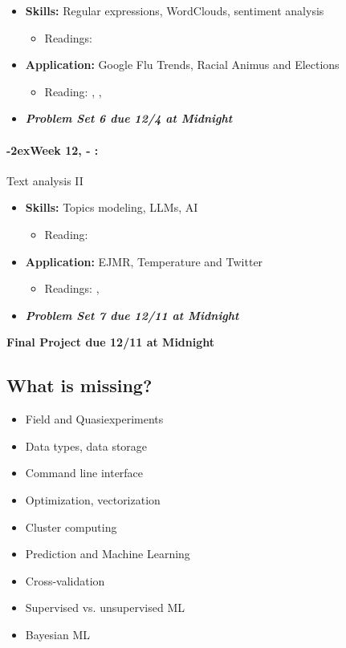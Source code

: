 \documentclass[11pt]{article}
\newcommand{\week}[1]{%
  \paragraph*{\kern-2ex\quad #1, \AdvanceDate[1]\syldate{\today} - \AdvanceDate[2]\syldate{\today}:}%
  \ifdim\wd1=\wd\MONDAY
    \AdvanceDate[7]
  \else
    \AdvanceDate[7]
  \fi%
}
\begin{document}
\begin{itemize}
  \item \textbf{Skills:} Regular expressions, WordClouds, sentiment analysis
  \begin{itemize}
    \item Readings: \textbf{\cite{gentzkow2019text}}
  \end{itemize}
  \item \textbf{Application:} Google Flu Trends, Racial Animus and Elections
  \begin{itemize}
    \item Reading: \textbf{\cite{lazer2014parable}}, \textbf{\cite{stephensdavidowitz2014racial}}, \cite{ginsberg2009influenza}
  \end{itemize}
\item \textit{\textbf{Problem Set 6 due 12/4 at Midnight}}
\end{itemize}
\week{Week 12} Text analysis II
\begin{itemize}
  \item \textbf{Skills:} Topics modeling, LLMs, AI
  \begin{itemize}
    \item Reading: \textbf{\cite{ash2023textalgorithms}}
  \end{itemize}
  \item \textbf{Application:} EJMR, Temperature and Twitter
  \begin{itemize}
    \item Readings: \textbf{\cite{wu2018gendered}}, \cite{moore2019temp}
  \end{itemize}
  \item \textit{\textbf{Problem Set 7 due 12/11 at Midnight}}
\end{itemize}

\textbf{Final Project due 12/11 at Midnight}

\subsection*{What is missing?}

\begin{itemize}
  \item Field and Quasiexperiments
  \item Data types, data storage
  \item Command line interface
  \item Optimization, vectorization
  \item Cluster computing
  \item Prediction and Machine Learning
  \item Cross-validation
  \item Supervised vs. unsupervised ML
  \item Bayesian ML
\end{itemize}
\end{document}
